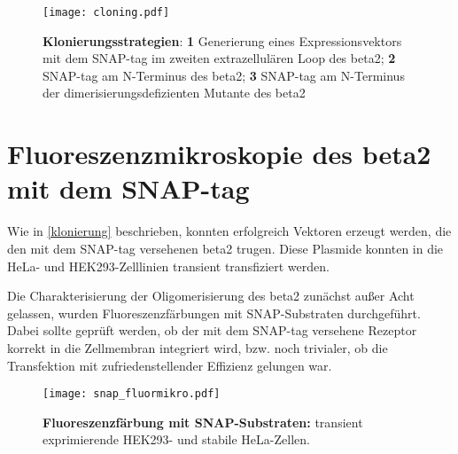 \begin{figure}[htp]
    \texttt{[image: cloning.pdf]}
    \caption{\textbf{Klonierungsstrategien}: \textbf{1} Generierung eines Expressionsvektors mit dem SNAP-tag im zweiten extrazellulären Loop des \gls{beta2}; \textbf{2} SNAP-tag am N-Terminus des \gls{beta2}; \textbf{3} SNAP-tag am N-Terminus der dimerisierungsdefizienten Mutante des \gls{beta2}}
    \label{fig:klonierung}
\end{figure}

\section{Fluoreszenzmikroskopie des \gls{beta2} mit dem SNAP-tag} \label{snapmikro}
Wie in \ref{klonierung} beschrieben, konnten erfolgreich Vektoren erzeugt werden, die den mit dem SNAP-tag versehenen \gls{beta2} trugen. Diese Plasmide konnten in die HeLa- und HEK293-Zelllinien transient transfiziert werden.

Die Charakterisierung der Oligomerisierung des \gls{beta2} zunächst außer Acht gelassen, wurden Fluoreszenzfärbungen mit SNAP-Substraten durchgeführt. Dabei sollte geprüft werden, ob der mit dem SNAP-tag versehene Rezeptor korrekt in die Zellmembran integriert wird, bzw. noch trivialer, ob die Transfektion mit zufriedenstellender Effizienz gelungen war.

\begin{figure}[htp]
    \texttt{[image: snap\_fluormikro.pdf]}
    \caption{\textbf{Fluoreszenzfärbung mit SNAP-Substraten:} transient exprimierende HEK293- und stabile HeLa-Zellen.}
    \label{fig:stainsnap}
\end{figure}

